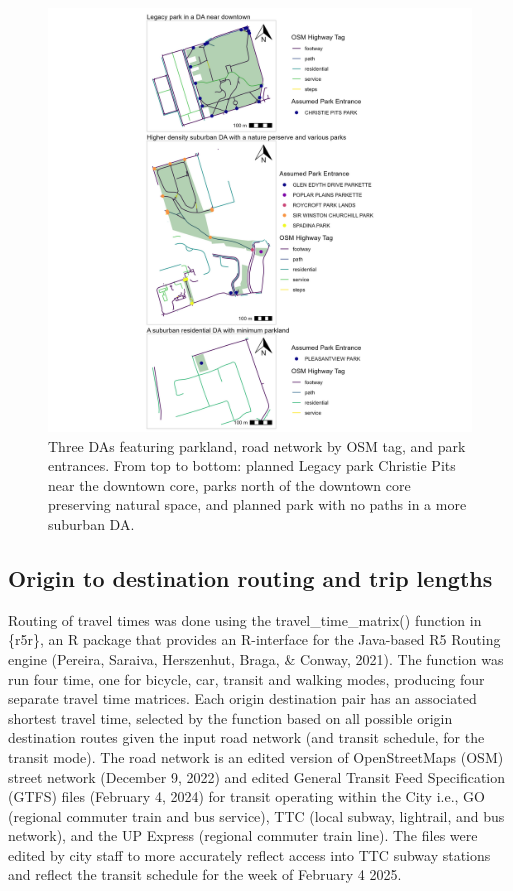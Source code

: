 \documentclass[
11pt, %
oneside, %
english, %
singlespacing, %
]{macthesis} %
\begin{document}
\begin{figure}

{\centering \includegraphics[width=6in]{./data/figures/chp3-park_entrance_example_plot} 

}

\caption{\label{fig:chp3-park_entrance_example_plot} Three DAs featuring parkland, road network by OSM tag, and park entrances. From top to bottom: planned Legacy park Christie Pits near the downtown core, parks north of the downtown core preserving natural space, and planned park with no paths in a more suburban DA.}\label{fig:unnamed-chunk-47}
\end{figure}

\subsection{Origin to destination routing and trip lengths}\label{origin-to-destination-routing-and-trip-lengths}

Routing of travel times was done using the travel\_time\_matrix() function in \{r5r\}, an R package that provides an R-interface for the Java-based R5 Routing engine (Pereira, Saraiva, Herszenhut, Braga, \& Conway, 2021). The function was run four time, one for bicycle, car, transit and walking modes, producing four separate travel time matrices. Each origin destination pair has an associated shortest travel time, selected by the function based on all possible origin destination routes given the input road network (and transit schedule, for the transit mode). The road network is an edited version of OpenStreetMaps (OSM) street network (December 9, 2022) and edited General Transit Feed Specification (GTFS) files (February 4, 2024) for transit operating within the City i.e., GO (regional commuter train and bus service), TTC (local subway, lightrail, and bus network), and the UP Express (regional commuter train line). The files were edited by city staff to more accurately reflect access into TTC subway stations and reflect the transit schedule for the week of February 4 2025.
\end{document}
